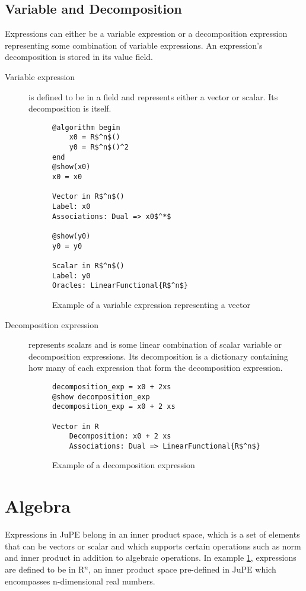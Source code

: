 \subsection*{Variable and Decomposition}
Expressions can either be a variable expression or a decomposition expression representing some combination of variable expressions. An expression's decomposition is stored in its value field.
\begin{description}
	\item[Variable expression] is defined to be in a field and represents either a vector or scalar. Its decomposition is itself.
\begin{figure}[h]
		\begin{lstlisting}[mathescape]
@algorithm begin
	x0 = R$^n$()
	y0 = R$^n$()^2
end
@show(x0)
x0 = x0

Vector in R$^n$()
Label: x0
Associations: Dual => x0$^*$

@show(y0)
y0 = y0

Scalar in R$^n$()
Label: y0
Oracles: LinearFunctional{R$^n$}
		\end{lstlisting}
	
	\caption{Example of a variable expression representing a vector}
	\label{ex_variable}
\end{figure}
	\item[Decomposition expression] represents scalars and is some linear combination of scalar variable or decomposition expressions. Its decomposition is a dictionary containing how many of each expression that form the decomposition expression.

\begin{figure}[h]
		\begin{lstlisting}[mathescape]
decomposition_exp = x0 + 2xs
@show decomposition_exp 
decomposition_exp = x0 + 2 xs

Vector in R
	Decomposition: x0 + 2 xs
	Associations: Dual => LinearFunctional{R$^n$}
		\end{lstlisting}
	\caption{Example of a decomposition expression}
	\label{ex_decomposition}
\end{figure}
\end{description}

\section{Algebra}
Expressions in JuPE belong in an inner product space, which is a set of elements that can be vectors or scalar and which supports certain operations such as norm and inner product in addition to algebraic operations. In example \ref{ex_variable}, expressions are defined to be in R$^n$, an inner product space pre-defined in JuPE which encompasses n-dimensional real numbers.

